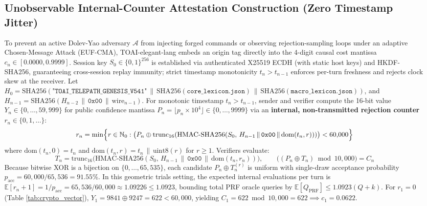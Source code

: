 \documentclass[9pt,a4paper]{extarticle}
\begin{document}
\subsection{Unobservable Internal-Counter Attestation Construction (Zero Timestamp Jitter)}
To prevent an active Dolev-Yao adversary $\mathcal{A}$ from injecting forged commands or observing rejection-sampling loops under an adaptive Chosen-Message Attack (EUF-CMA), TOAI-elegant-lang embeds an origin tag directly into the 4-digit causal cost mantissa $c_n \in [0.0000, 0.9999]$. Session key $S_0 \in \{0,1\}^{256}$ is established via authenticated X25519 ECDH (with static host keys) and HKDF-SHA256, guaranteeing cross-session replay immunity; strict timestamp monotonicity $t_n > t_{n-1}$ enforces per-turn freshness and rejects clock skew at the receiver. Let $H_0 = \text{SHA256}(\texttt{"TOAI\_TELEPATH\_GENESIS\_V541"} \,\|\,\allowbreak \text{SHA256}(\texttt{core\_lexicon.json}) \,\|\,\allowbreak \text{SHA256}(\texttt{macro\_lexicon.json}))$, and $H_{n-1} = \text{SHA256}(H_{n-2} \,\|\, \texttt{0x00} \,\|\, \text{wire}_{n-1})$. For monotonic timestamp $t_n > t_{n-1}$, sender and verifier compute the 16-bit value $Y_n \in \{0, \dots, 59{,}999\}$ for public confidence mantissa $P_n = \lfloor p_n \times 10^4 \rfloor \in \{0, \dots, 9999\}$ via an \textbf{internal, non-transmitted rejection counter} $r_n \in \{0, 1, \dots\}$:
\begin{equation}
  r_n = \min\Bigl\{ r \in \mathbb{N}_0 : \bigl(P_n \oplus \text{trunc}_{16}(\text{HMAC-SHA256}(S_0,\, H_{n-1} \,\|\, \texttt{0x00} \,\|\, \text{dom}(t_n, r)))\bigr) < 60{,}000 \Bigr\}
  \label{eq:internal_counter}
\end{equation}
where $\text{dom}(t_n, 0) = t_n$ and $\text{dom}(t_n, r) = t_n \,\|\, \text{uint8}(r)$ for $r \ge 1$. Verifiers evaluate:
\begin{equation}
  T_n = \text{trunc}_{16}\bigl(\text{HMAC-SHA256}(S_0,\, H_{n-1} \,\|\, \texttt{0x00} \,\|\, \text{dom}(t_n, r_n))\bigr), \qquad \bigl( (P_n \oplus T_n) \bmod 10{,}000 \bigr) = C_n
  \label{eq:mac_verify}
\end{equation}
Because bitwise XOR is a bijection on $\{0, \dots, 65{,}535\}$, each candidate $P_n \oplus T_n^{(r)}$ is uniform with single-draw acceptance probability $p_{\text{acc}} = 60{,}000/65{,}536 = 91.55\%$. In this geometric trials setting, the expected internal evaluations per turn is $\mathbb{E}[r_n+1] = 1/p_{\text{acc}} = 65{,}536/60{,}000 \approx 1.09226 \le 1.0923$, bounding total PRF oracle queries by $\mathbb{E}[Q_{\text{PRF}}] \le 1.0923(Q+k)$. For $r_1=0$ (Table \ref{tab:crypto_vector}), $Y_1 = 9841 \oplus 9247 = 622 < 60{,}000$, yielding $C_1 = 622 \bmod 10{,}000 = 622 \implies c_1 = 0.0622$.
\end{document}
